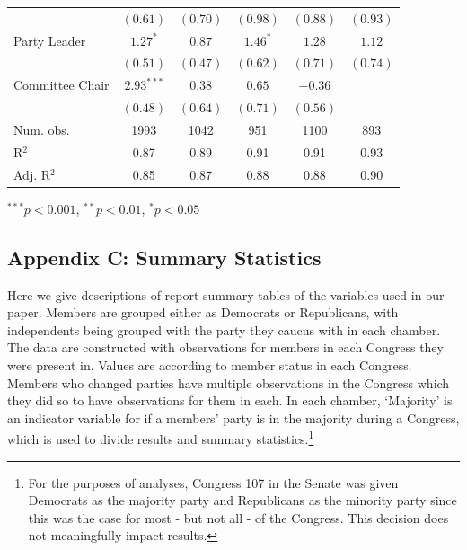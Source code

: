 \documentclass[12pt]{article}
\begin{document}
\begin{table}[H]
\begin{threeparttable}
\begin{tabular}{l c c c c c }
& $(0.61)$      & $(0.70)$     & $(0.98)$      & $(0.88)$      & $(0.93)$     \\
Party Leader                  & $1.27^{*}$    & $0.87$       & $1.46^{*}$    & $1.28$        & $1.12$       \\
& $(0.51)$      & $(0.47)$     & $(0.62)$      & $(0.71)$      & $(0.74)$     \\
Committee Chair                   & $2.93^{***}$  & $0.38$       & $0.65$        & $-0.36$       &              \\
& $(0.48)$      & $(0.64)$     & $(0.71)$      & $(0.56)$      &              \\
\hline
Num. obs.               & 1993          & 1042         & 951           & 1100          & 893          \\
R$^2$      & 0.87          & 0.89         & 0.91          & 0.91          & 0.93         \\
Adj. R$^2$ & 0.85          & 0.87         & 0.88          & 0.88          & 0.90         \\
\hline
\end{tabular}
\begin{tablenotes}
   \item
   $^{***}p<0.001$, $^{**}p<0.01$, $^*p<0.05$
 \end{tablenotes}
\end{threeparttable}
\end{table}

\clearpage

\subsection*{Appendix C: Summary Statistics}
%

Here we give descriptions of report summary tables of the variables used in our paper. Members are grouped either as Democrats or Republicans, with independents being grouped with the party they caucus with in each chamber. The data are constructed with observations for members in each Congress they were present in. Values are according to member status in each Congress. Members who changed parties have multiple observations in the Congress which they did so to have observations for them in each. In each chamber, `Majority' is an indicator variable for if a members' party is in the majority during a Congress, which is used to divide results and summary statistics.\footnote{\doublespacing\normalsize For the purposes of analyses, Congress 107 in the Senate was given Democrats as the majority party and Republicans as the minority party since this was the case for most - but not all - of the Congress. This decision does not meaningfully impact results.}
\end{document}
